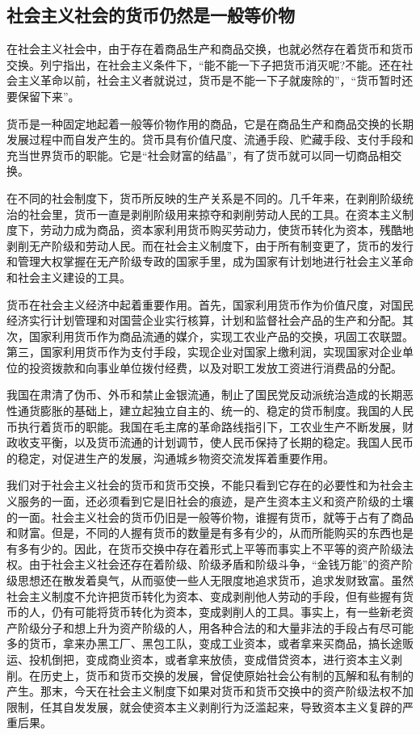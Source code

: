 \documentclass{book}
\begin{document}
\subsection{社会主义社会的货币仍然是一般等价物}

在社会主义社会中，由于存在着商品生产和商品交换，也就必然存在着货币和货币交换。列宁指出，在社会主义条件下，“能不能一下子把货币消灭呢?不能。还在社会主义革命以前，社会主义者就说过，货币是不能一下子就废除的”，“货币暂时还要保留下来”。

货币是一种固定地起着一般等价物作用的商品，它是在商品生产和商品交换的长期发展过程中而自发产生的。贷币具有价值尺度、流通手段、贮藏手段、支付手段和充当世界货币的职能。它是“社会财富的结晶”，有了货币就可以同一切商品相交换。

在不同的社会制度下，货币所反映的生产关系是不同的。几千年来，在剥削阶级统治的社会里，货币一直是剥削阶级用来掠夺和剥削劳动人民的工具。在资本主义制度下，劳动力成为商品，资本家利用货币购买劳动力，使货币转化为资本，残酷地剥削无产阶级和劳动人民。而在社会主义制度下，由于所有制变更了，货币的发行和管理大权掌握在无产阶级专政的国家手里，成为国家有计划地进行社会主义革命和社会主义建设的工具。

货币在社会主义经济中起着重要作用。首先，国家利用货币作为价值尺度，对国民经济实行计划管理和对国营企业实行核算，计划和监督社会产品的生产和分配。其次，国家利用货币作为商品流通的媒介，实现工农业产品的交换，巩固工农联盟。第三，国家利用货币作为支付手段，实现企业对国家上缴利润，实现国家对企业单位的投资拨款和向事业单位拨付经费，以及对职工发放工资进行消费品的分配。

我国在肃清了伪币、外币和禁止金银流通，制止了国民党反动派统治造成的长期恶性通货膨胀的基础上，建立起独立自主的、统一的、稳定的贷币制度。我国的人民币执行着货币的职能。我国在毛主席的革命路线指引下，工农业生产不断发展，财政收支平衡，以及货币流通的计划调节，使人民币保持了长期的稳定。我国人民币的稳定，对促进生产的发展，沟通城乡物资交流发挥着重要作用。

我们对于社会主义社会的货币和货币交换，不能只看到它存在的必要性和为社会主义服务的一面，还必须看到它是旧社会的痕迹，是产生资本主义和资产阶级的土壤的一面。社会主义社会的货币仍旧是一般等价物，谁握有货币，就等于占有了商品和财富。但是，不同的人握有货币的数量是有多有少的，从而所能购买的东西也是有多有少的。因此，在货币交换中存在着形式上平等而事实上不平等的资产阶级法权。由于社会主义社会还存在着阶级、阶级矛盾和阶级斗争，“金钱万能”的资产阶级思想还在散发着臭气，从而驱使一些人无限度地追求货币，追求发财致富。虽然社会主义制度不允许把货币转化为资本、变成剥削他人劳动的手段，但有些握有货币的人，仍有可能将货币转化为资本，变成剥削人的工具。事实上，有一些新老资产阶级分子和想上升为资产阶级的人，用各种合法的和大量非法的手段占有尽可能多的货币，拿来办黑工厂、黑包工队，变成工业资本，或者拿来买商品，搞长途贩运、投机倒把，变成商业资本，或者拿来放债，变成借贷资本，进行资本主义剥削。在历史上，货币和货币交换的发展，曾促使原始社会公有制的瓦解和私有制的产生。那末，今天在社会主义制度下如果对货币和货币交换中的资产阶级法权不加限制，任其自发发展，就会使资本主义剥削行为泛滥起来，导致资本主义复辟的严重后果。
\end{document}
